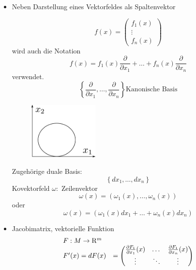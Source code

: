 \documentclass[ngerman]{tudscrreprt}
\begin{document}
\begin{itemize}
\item Neben Darstellung eines Vektorfeldes als Spaltenvektor 

\begin{equation*}
f(x) = \begin{pmatrix}
f_1(x)\\ \vdots\\ f_n(x)
\end{pmatrix}
\end{equation*} wird auch die Notation 
\begin{equation*}
f(x) = f_1(x) \frac{\partial}{\partial x_1} + \dots + f_n(x)\frac{\partial}{\partial x_n}
\end{equation*}
verwendet. \begin{equation*}
\left\{
\frac{\partial }{\partial x_1}, \dots , \frac{\partial }{\partial x_n}
\right\} \text{Kanonische Basis}
\end{equation*} 
\begin{figure}[H]
\centering
\def\svgwidth{200pt} 
  \includegraphics[width=3.5cm]{image17_1.pdf}
\end{figure}
Zugehörige duale Basis: \begin{equation*}
\left\{ 
dx_1,\dots, dx_n
\right\}
\end{equation*}
Kovektorfeld $\omega:$ Zeilenvektor \begin{equation*}
\omega (x) = (\omega_1 (x) , \dots,\omega_n(x) )
\end{equation*} 
oder 
\begin{equation*}
\omega (x) = (\omega_1 (x) dx_1 + \dots + \omega_n(x)dx_n )
\end{equation*} 
\item Jacobimatrix, vektorielle Funktion
\begin{equation*}
\begin{array}{l l }
F: M \to \mathrm{R}^m & \\ 
F'(x) = dF(x) & = 
\begin{pmatrix}
\frac{\partial F_1}{\partial x_1}(x) &\dots& \frac{\partial F_1}{\partial x_n}(x)\\ 
\vdots & \ddots & \vdots \\ 

\end{pmatrix}
\end{array}
\end{equation*}
\end{itemize}
\end{document}
